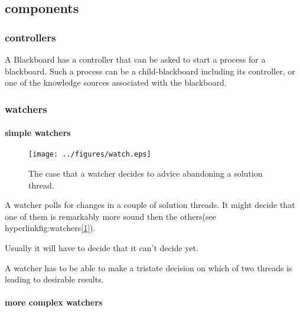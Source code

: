 \documentclass[]{lofar}
\begin{document}
    \subsection{components}
    \label{subsec:components}\hypertarget{subsec:components}{}

      \subsubsection{controllers}
      \label{subsubsec:controllers}\hypertarget{subsubsec:controllers}{}

        A Blackboard has a controller that can be asked to start a
        process for a blackboard. Such a process can be a
        child-blackboard including its controller, or one of the
        knowledge sources associated with the blackboard.

      \subsubsection{watchers}
      \label{subsubsec:watchers}\hypertarget{subsubsec:watchers}{}

        \paragraph{simple watchers}
        \label{par:simple-watchers}\hypertarget{par:simple-watchers}{}
          \begin{figure}
            \texttt{[image: ../figures/watch.eps]}
            \hypertarget{fig:watchers}{}
            \caption{The case that a watcher decides to advice
            abandoning a solution thread.\label{fig:watchers}}
          \end{figure}

          A watcher polls for changes in a couple of solution
          threads. It might decide that one of them is remarkably more
          sound then the others(see
          hyperlink{fig:watchers}{[\ref{fig:watchers}]}).

          Usually it will have to decide that it can't decide yet.

          \begin{requirement}
            A watcher has to be able to make a tristate decision on
            which of two threads is leading to desirable results.
            \caption{tristate decisions\label{req:no-decision}}
          \end{requirement}

        \paragraph{more complex watchers}
        \label{par:complex-watchers}\hypertarget{par:complex-watchers}{}
\end{document}
